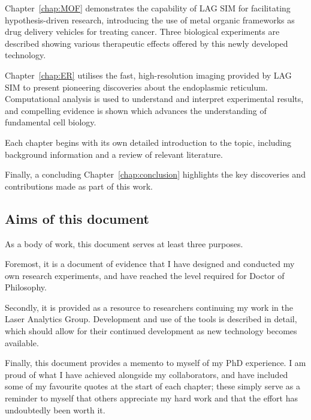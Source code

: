 Chapter~\ref{chap:MOF} demonstrates the capability of LAG SIM for facilitating hypothesis-driven research, introducing the use of metal organic frameworks as drug delivery vehicles for treating cancer. 
Three biological experiments are described showing various therapeutic effects offered by this newly developed technology. 

Chapter~\ref{chap:ER} utilises the fast, high-resolution imaging provided by LAG SIM to present pioneering discoveries about the endoplasmic reticulum. 
Computational analysis is used to understand and interpret experimental results, and compelling evidence is shown which advances the understanding of fundamental cell biology. 

Each chapter begins with its own detailed introduction to the topic, including background information and a review of relevant literature. 

Finally, a concluding Chapter~\ref{chap:conclusion} highlights the key discoveries and contributions made as part of this work.

\subsection{Aims of this document}
As a body of work, this document serves at least three purposes. 

Foremost, it is a document of evidence that I have designed and conducted my own research experiments, and have reached the level required for Doctor of Philosophy. 

Secondly, it is provided as a resource to researchers continuing my work in the Laser Analytics Group. 
Development and use of the tools is described in detail, which should allow for their continued development as new technology becomes available. 

Finally, this document provides a memento to myself of my PhD experience. 
I am proud of what I have achieved alongside my collaborators, and have included some of my favourite quotes at the start of each chapter; these simply serve as a reminder to myself that others appreciate my hard work and that the effort has undoubtedly been worth it. 


